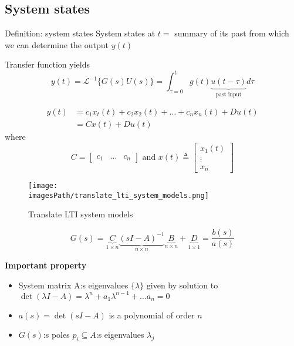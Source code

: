 \documentclass{article}
\newcommand{\imagesPath}{images}
\begin{document}
\subsection{System states}
\begin{definitionblock}{Definition: system states}
   System states at $t=$ summary of its past from which we can determine the output $y(t)$ 

   Transfer function yields 
   \begin{equation*}
       y(t) = \mathcal{L}^{-1}\{ G(s)U(s) \} = \int_{\tau=0}^{t} g(t)\underbrace{u(t-\tau)}_\text{past input} d\tau
   \end{equation*}

   \begin{align*}
       y(t) &= c_1x_t(t) + c_2x_2(t) + \ldots + c_nx_n(t) + Du(t) \\
       &= Cx(t) + Du(t)
   \end{align*}
   where
   \begin{equation*}
       C = \begin{bmatrix} c_1 & \ldots & c_n \end{bmatrix}
        \text{ and } 
        x(t) \triangleq \begin{bmatrix} x_{1}(t) \\ \vdots \\ x_{n} \end{bmatrix}
   \end{equation*}
\end{definitionblock}

\begin{figure}[!h]
    \centering
    \texttt{[image: \\imagesPath/translate\_lti\_system\_models.png]}
    \caption{Translate LTI system models}
\end{figure}

\begin{equation*}
    G(s) = \underbrace{C}_{1\times n}\underbrace{(sI-A)^{-1}}_{n\times n}
    \underbrace{B}_{n\times n} + \underbrace{D}_{1\times 1} = \frac{b(s)}{a(s)}
\end{equation*}

\textbf{Important property}
\begin{itemize}
    \item System matrix A:s eigenvalues $\{\lambda\}$ given by solution to 
    $\det(\lambda I - A) = \lambda^n + a_1\lambda^{n-1} + \ldots a_n = 0$
    \item $a(s) = \det(sI - A)$ is a polynomial of order $n$
    \item $G(s)$:s poles $p_i \subseteq A$:s eigenvalues $\lambda_j$
\end{itemize}
\end{document}
